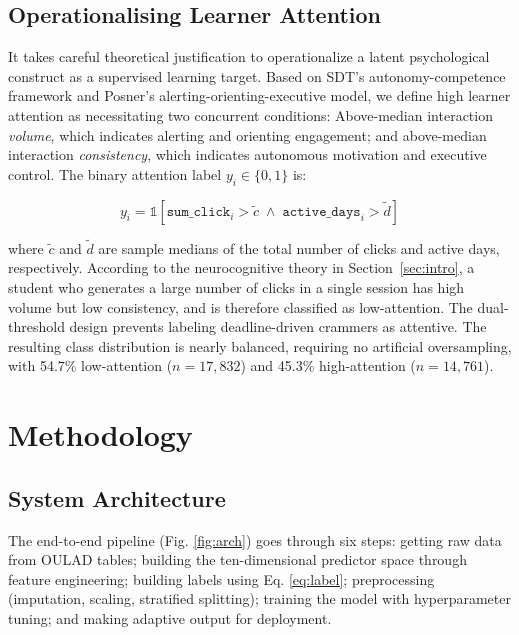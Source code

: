 \documentclass[conference]{IEEEtran}
\begin{document}
\subsection{Operationalising Learner Attention}
\label{sec:label}

It takes careful theoretical justification to operationalize a latent psychological construct as a supervised learning target. Based on SDT's autonomy-competence framework and Posner's alerting-orienting-executive model, we define high learner attention as necessitating two concurrent conditions:
Above-median interaction \textit{volume}, which indicates alerting and orienting engagement; and above-median interaction \textit{consistency}, which indicates autonomous motivation and executive control. The binary attention label $y_i \in \{0, 1\}$ is:

\begin{equation}
y_i = \mathbb{1}\!\left[\texttt{sum\_click}_i > \tilde{c}
      \;\wedge\;
      \texttt{active\_days}_i > \tilde{d}\right]
\label{eq:label}
\end{equation}

where $\tilde{c}$ and $\tilde{d}$ are sample medians of the total number of clicks and active days, respectively. According to the neurocognitive theory in Section~\ref{sec:intro}, a student who generates a large number of clicks in a single session has high volume but low consistency, and is therefore classified as low-attention. The dual-threshold design prevents labeling deadline-driven crammers as attentive. The resulting class distribution is nearly balanced, requiring no artificial oversampling, with 54.7\% low-attention ($n = 17{,}832$) and 45.3\% high-attention ($n = 14{,}761$).

\section{Methodology}
\label{sec:method}

\subsection{System Architecture}

The end-to-end pipeline (Fig. \ref{fig:arch}) goes through six steps: getting raw data from OULAD tables; building the ten-dimensional predictor space through feature engineering; building labels using Eq. \ref{eq:label}; preprocessing (imputation, scaling, stratified splitting); training the model with hyperparameter tuning; and making adaptive output for deployment.
\end{document}
